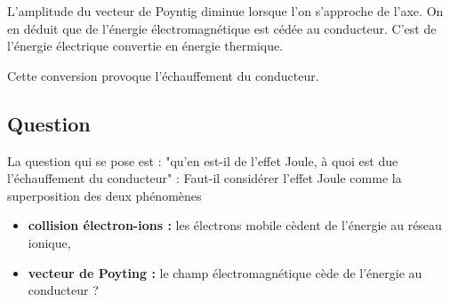 L'amplitude du vecteur de Poyntig diminue lorsque l'on s'approche de l'axe. On en déduit que de l'énergie électromagnétique est cédée au conducteur. C'est de l'énergie électrique convertie en énergie thermique.

Cette conversion provoque l'échauffement du conducteur.
\subsection{Question}
La question qui se pose est : "qu'en est-il de l'effet Joule, à quoi est due l'échauffement du conducteur" : Faut-il considérer l'effet Joule comme la superposition des deux phénomènes
\begin{itemize}[leftmargin=1cm, label=, itemsep=1pt]
\item {\bf collision électron-ions :} les électrons mobile cèdent de l'énergie au réseau ionique,
\item {\bf vecteur de Poyting :} le champ électromagnétique cède de l'énergie au conducteur ?
\end{itemize}

